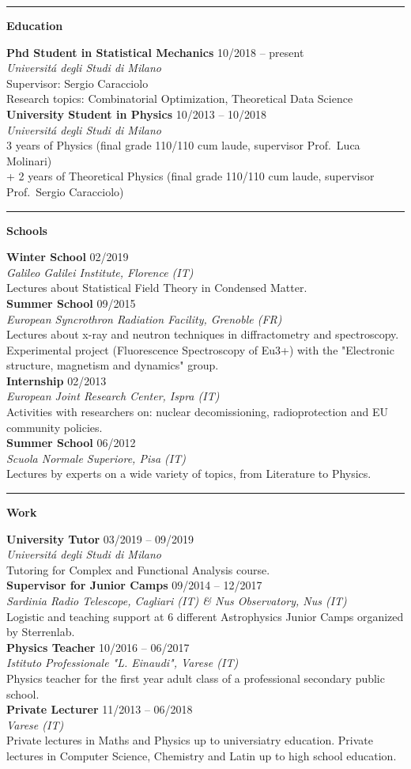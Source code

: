 \documentclass[a4paper]{article}
\newcommand{\block}[1]{\hrule \vspace{0.2cm} \textbf{\Large #1} \vspace{0.2cm}}
\newcommand{\voice}[4]{\textbf{#1} \hfill #2 \\ \textit{#3} \\ {\small #4} \vspace{0.2cm} \\}
\begin{document}
\begin{minipage}[t]{0.6\columnwidth}
    

    \block{Education}

    
    \voice{Phd Student in Statistical Mechanics}
        {10/2018 -- present}
        {Universit\'a degli Studi di Milano}
        {Supervisor: Sergio Caracciolo\\ Research topics: Combinatorial Optimization, Theoretical Data Science}
    \voice{University Student in Physics}
        {10/2013 -- 10/2018}
        {Universit\'a degli Studi di Milano}
        {3 years of Physics (final grade 110/110 cum laude, supervisor Prof.~Luca Molinari)\\+ 2 years of Theoretical Physics (final grade 110/110 cum laude, supervisor Prof.~Sergio Caracciolo)}



    \block{Schools}

    
    \voice{Winter School}
        {02/2019}
        {Galileo Galilei Institute, Florence (IT)}
        {Lectures about Statistical Field Theory in Condensed Matter.}
    \voice{Summer School}
        {09/2015}
        {European Syncrothron Radiation Facility, Grenoble (FR)}
        {Lectures about x-ray and neutron techniques in diffractometry and spectroscopy. Experimental project (Fluorescence Spectroscopy of Eu3+) with the "Electronic structure, magnetism and dynamics" group.}
    \voice{Internship}
        {02/2013}
        {European Joint Research Center, Ispra (IT)}
        {Activities with researchers on: nuclear decomissioning, radioprotection and EU community policies.}
    \voice{Summer School}
        {06/2012}
        {Scuola Normale Superiore, Pisa (IT)}
        {Lectures by experts on a wide variety of topics, from Literature to Physics.}



    \block{Work}

    
    \voice{University Tutor}
        {03/2019 -- 09/2019}
        {Universit\'a degli Studi di Milano}
        {Tutoring for Complex and Functional Analysis course.}
    \voice{Supervisor for Junior Camps}
        {09/2014 -- 12/2017}
        {Sardinia Radio Telescope, Cagliari (IT) \& Nus Observatory, Nus (IT)}
        {Logistic and teaching support at 6 different Astrophysics Junior Camps organized by Sterrenlab.}
    \voice{Physics Teacher}
        {10/2016 -- 06/2017}
        {Istituto Professionale "L. Einaudi", Varese (IT)}
        {Physics teacher for the first year adult class of a professional secondary public school.}
    \voice{Private Lecturer}
        {11/2013 -- 06/2018}
        {Varese (IT)}
        {Private lectures in Maths and Physics up to universiatry education. Private lectures in Computer Science, Chemistry and Latin up to high school education.}


\end{minipage} 
\end{document}
